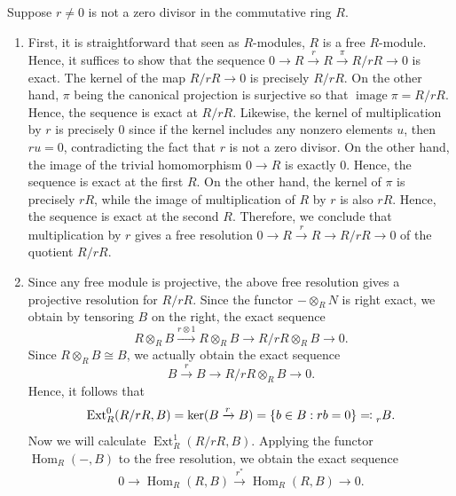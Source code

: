 \documentclass{article}
\begin{document}
	Suppose $r \neq 0$ is not a zero divisor in the commutative ring $R$.\vspace{-0.25cm}
	\begin{enumerate}[itemsep =-2pt,label= \textbf{(\alph{*})}]
		\item First, it is straightforward that seen as $R$-modules, $R$ is a free $R$-module. Hence, it suffices to show that the sequence $0 \to R \xrightarrow{r} R \xrightarrow{\pi} R/rR \to 0$ is exact. The kernel of the map $R/rR \to 0$ is precisely $R/rR$. On the other hand, $\pi$ being the canonical projection is surjective so that $\operatorname{image}{\pi} = R/rR$. Hence, the sequence is exact at $R/rR$. Likewise, the kernel of multiplication by $r$ is precisely 0 since if the kernel includes any nonzero elements $u$, then $ru = 0$, contradicting the fact that $r$ is not a zero divisor. On the other hand, the image of the trivial homomorphism $0 \to R$ is exactly 0. Hence, the sequence is exact at the first $R$. On the other hand, the kernel of $\pi$ is precisely $rR$, while the image of multiplication of $R$ by $r$ is also $rR$. Hence, the sequence is exact at the second $R$. Therefore, we conclude that multiplication by $r$ gives a free resolution $0 \to R \xrightarrow{r} R \to R/rR \to 0$ of the quotient $R/rR$.
		\item Since any free module is projective, the above free resolution gives a projective resolution for $R/rR$. Since the functor $- \otimes_{R} N$ is right exact, we obtain by tensoring $B$ on the right, the exact sequence 
		\begin{equation*}
			R \otimes_{R} B \xrightarrow{r \otimes 1} R \otimes_{R} B \to R/rR \otimes_{R} B \to 0. 
		\end{equation*}
		Since $R \otimes_{R} B \cong B$, we actually obtain the exact sequence 
		\begin{equation*}
			B \xrightarrow{r} B \to R/rR \otimes_{R}B \to 0. 
		\end{equation*}
		Hence, it follows that 
		\begin{equation*}
			\operatorname{Ext}_{R}^{0}(R/rR, B) = \ker(B \xrightarrow{r} B) = \{b \in B: rb = 0\} \eqqcolon \prescript{}{r}{B}. 
		\end{equation*}
		Now we will calculate $\operatorname{Ext}_{R}^{1}(R/rR, B)$. Applying the functor $\operatorname{Hom}_{R}(-, B)$ to the free resolution, we obtain the exact sequence
		\begin{equation*}
			0 \to \operatorname{Hom}_{R}(R, B) \xrightarrow{r^{\ast}} \operatorname{Hom}_{R}(R, B) \to 0. 

\end{equation*}
\end{enumerate}
\end{document}
